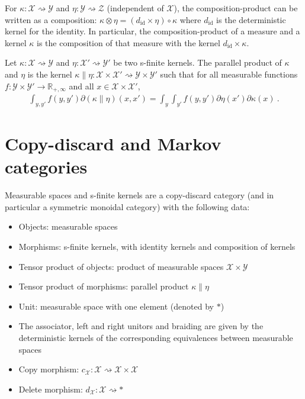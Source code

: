 For $\kappa : \mathcal X \rightsquigarrow \mathcal Y$ and $\eta : \mathcal Y \rightsquigarrow \mathcal Z$ (independent of $\mathcal X$), the composition-product can be written as a composition: $\kappa \otimes \eta = (d_{\text{id}} \times \eta) \circ \kappa$ where $d_{\text{id}}$ is the deterministic kernel for the identity.
In particular, the composition-product of a measure and a kernel $\kappa$ is the composition of that measure with the kernel $d_{\text{id}} \times \kappa$.

\begin{definition}
  \label{def:kernel_parallel_prod}
  \leanok
  Let $\kappa : \mathcal X \rightsquigarrow \mathcal Y$ and $\eta : \mathcal X' \rightsquigarrow \mathcal Y'$ be two s-finite kernels.
  The parallel product of $\kappa$ and $\eta$ is the kernel $\kappa \parallel \eta : \mathcal X \times \mathcal X' \rightsquigarrow \mathcal Y \times \mathcal Y'$ such that for all measurable functions $f : \mathcal Y \times \mathcal Y' \to \mathbb{R}_{+,\infty}$ and all $x \in \mathcal X \times \mathcal X'$,
  \begin{align*}
  \int_{y,y'} f(y,y') \partial(\kappa \parallel \eta)(x,x') = \int_y \int_{y'} f(y,y') \partial\eta(x') \partial\kappa(x) \: .
  \end{align*}
\end{definition}



\section{Copy-discard and Markov categories}

Measurable spaces and s-finite kernels are a copy-discard category (and in particular a symmetric monoidal category) with the following data:
\begin{itemize}
  \item Objects: measurable spaces
  \item Morphisms: s-finite kernels, with identity kernels and composition of kernels
  \item Tensor product of objects: product of measurable spaces $\mathcal X \times \mathcal Y$
  \item Tensor product of morphisms: parallel product $\kappa \parallel \eta$ 
  \item Unit: measurable space with one element (denoted by $*$)
  \item The associator, left and right unitors and braiding are given by the deterministic kernels of the corresponding equivalences between measurable spaces
  \item Copy morphism: $c_{\mathcal X}: \mathcal X \rightsquigarrow \mathcal X \times \mathcal X$
  \item Delete morphism: $d_{\mathcal X} : \mathcal X \rightsquigarrow *$
\end{itemize}

